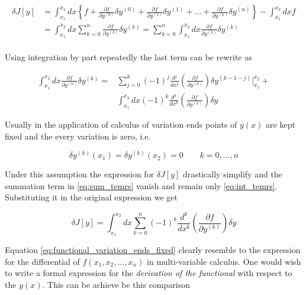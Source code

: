 \begin{align*}
  \delta J[y]
  &=\int_{x_1}^{x_2} dx \left\{ f +
    \frac{\partial f}{\partial y^{(0)}} \delta y^{(0)} +
    \frac{\partial f}{\partial y^{(1)}} \delta y^{(1)} + \ldots +
    \frac{\partial f}{\partial y^{(n)}} \delta y^{(n)}
    \right\} - \int_{x_1}^{x_2} dx f \\
  &=\int_{x_1}^{x_2} dx
    \sum_{k = 0}^{n} \frac{\partial f}{\partial y^{(k)}} \delta y^{(k)}
   =\sum_{k = 0}^{n}
    \int_{x_1}^{x_2} dx \frac{\partial f}{\partial y^{(k)}} \delta y^{(k)} \\
\end{align*}

Using integration by part repeatedly the last term can be rewrite as

\begin{align}
  \label{eq:sum_temrs}
  \int_{x_1}^{x_2} dx \frac{\partial f}{\partial y^{(k)}} \delta y^{(k)} =
  & \sum_{j=0}^{k} (-1)^j \frac{d^j}{dx^j}
  \left( \frac{\partial f}{\partial y^{(k)}} \right) \delta y^{(k-1-j)}
  \Big|_{x_1}^{x_2} + \\
  \label{eq:int_temrs}
  & \int_{x_1}^{x_2} dx (-1)^k \frac{d^k}{dx^k}
  \left( \frac{\partial f}{\partial y^{(k)}}\right) \delta y
\end{align}

Usually in the application of calculus of variation ends points of $y(x)$ are
kept fixed and the every variation is zero, i.e.

\begin{equation} \label{eq:fixed_ends}
  \delta y^{(k)}(x_1) = \delta y^{(k)}(x_2) = 0  \qquad k = 0, \ldots, n
\end{equation}

Under this assumption the expression for $\delta J[y]$ drastically simplify and
the summation term in \eqref{eq:sum_temrs} vanish and remain only
\eqref{eq:int_temrs}. Substituting it in the original expression we get

\begin{equation} \label{eq:functional_variation_ends_fixed}
  \delta J[y] = \int_{x_1}^{x_2} dx \sum_{k = 0}^{n} (-1)^k \frac{d^k}{dx^k}
  \left( \frac{\partial f}{\partial y^{(k)}}\right) \delta y
\end{equation}

Equation \eqref{eq:functional_variation_ends_fixed} clearly resemble to the
expression for the differential of $f(x_1, x_2, \ldots, x_n)$ in multi-variable
calculus. One would wish to write a formal expression for the \emph{derivation
of the functional} with respect to the $y(x)$. This can be achieve be this
comparison

